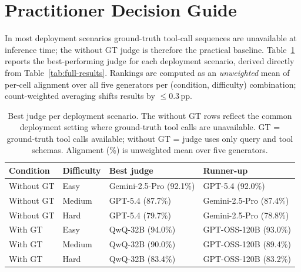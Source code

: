 \section{Practitioner Decision Guide}
\label{app:decision-guide}

In most deployment scenarios ground-truth tool-call sequences are unavailable at inference time; the without GT judge is therefore the practical baseline. Table~\ref{tab:decision-guide} reports the best-performing judge for each deployment scenario, derived directly from Table~\ref{tab:full-results}. Rankings are computed as an \emph{unweighted} mean of per-cell alignment over all five generators per (condition, difficulty) combination; count-weighted averaging shifts results by $\leq 0.3$\,pp.

\begin{table}[!htbp]
\centering
\small
\setlength{\tabcolsep}{5pt}
\renewcommand{\arraystretch}{1.2}
\begin{tabularx}{\columnwidth}{@{}llXX@{}}
\toprule
\textbf{Condition} & \textbf{Difficulty} & \textbf{Best judge} & \textbf{Runner-up} \\
\midrule
Without GT & Easy   & Gemini-2.5-Pro (92.1\%) & GPT-5.4 (92.0\%)      \\
Without GT & Medium & GPT-5.4 (87.7\%)        & Gemini-2.5-Pro (87.4\%) \\
Without GT & Hard   & GPT-5.4 (79.7\%)        & Gemini-2.5-Pro (78.8\%) \\
\midrule
With GT    & Easy   & QwQ-32B (94.0\%)        & GPT-OSS-120B (93.0\%) \\
With GT    & Medium & QwQ-32B (90.0\%)        & GPT-OSS-120B (89.4\%) \\
With GT    & Hard   & QwQ-32B (83.4\%)        & GPT-OSS-120B (83.2\%) \\
\bottomrule
\end{tabularx}
\caption{Best judge per deployment scenario. The without GT rows reflect the common deployment setting where ground-truth tool calls are unavailable. GT = ground-truth tool calls available; without GT = judge uses only query and tool schemas. Alignment (\%) is unweighted mean over five generators.}
\label{tab:decision-guide}
\end{table}

